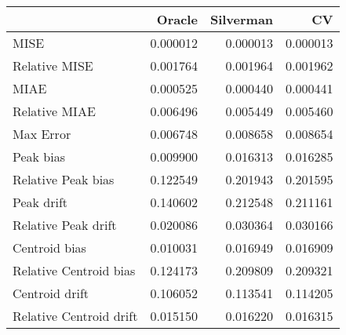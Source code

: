 \begin{tabular}{lrrr}
  \hline
 & Oracle & Silverman & CV \\ 
  \hline
MISE & 0.000012 & 0.000013 & 0.000013 \\ 
  Relative MISE & 0.001764 & 0.001964 & 0.001962 \\ 
  MIAE & 0.000525 & 0.000440 & 0.000441 \\ 
  Relative MIAE & 0.006496 & 0.005449 & 0.005460 \\ 
  Max Error & 0.006748 & 0.008658 & 0.008654 \\ 
  Peak bias & 0.009900 & 0.016313 & 0.016285 \\ 
  Relative Peak bias & 0.122549 & 0.201943 & 0.201595 \\ 
  Peak drift & 0.140602 & 0.212548 & 0.211161 \\ 
  Relative Peak drift & 0.020086 & 0.030364 & 0.030166 \\ 
  Centroid bias & 0.010031 & 0.016949 & 0.016909 \\ 
  Relative Centroid bias & 0.124173 & 0.209809 & 0.209321 \\ 
  Centroid drift & 0.106052 & 0.113541 & 0.114205 \\ 
  Relative Centroid drift & 0.015150 & 0.016220 & 0.016315 \\ 
   \hline
\end{tabular}
